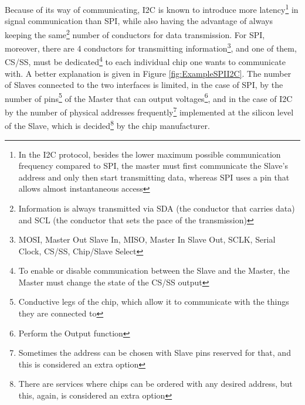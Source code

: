 \documentclass[a4paper, 10pt, final]{article} %
\begin{document}
    Because of its way of communicating, I2C is known to introduce more latency\footnote{In the I2C protocol, besides the lower maximum possible communication frequency compared to SPI, the master must first communicate the Slave's address and only then start transmitting data, whereas SPI uses a pin that allows almost instantaneous access} in signal communication than SPI, while also having the advantage of always keeping the same\footnote{Information is always transmitted via SDA (the conductor that carries data) and SCL (the conductor that sets the pace of the transmission)} number of conductors for data transmission.
    For SPI, moreover, there are 4 conductors for transmitting information\footnote{MOSI, Master Out Slave In, MISO, Master In Slave Out, SCLK, Serial Clock, CS/SS, Chip/Slave Select}, and one of them, CS/SS, must be dedicated\footnote{To enable or disable communication between the Slave and the Master, the Master must change the state of the CS/SS output} to each individual chip one wants to communicate with.
    A better explanation is given in Figure \ref{fig:ExampleSPII2C}.
    The number of Slaves connected to the two interfaces is limited, in the case of SPI, by the number of pins\footnote{Conductive legs of the chip, which allow it to communicate with the things they are connected to} of the Master that can output voltages\footnote{Perform the Output function}, and in the case of I2C by the number of physical addresses frequently\footnote{Sometimes the address can be chosen with Slave pins reserved for that, and this is considered an extra option} implemented at the silicon level of the Slave, which is decided\footnote{There are services where chips can be ordered with any desired address, but this, again, is considered an extra option} by the chip manufacturer.
\end{document}
